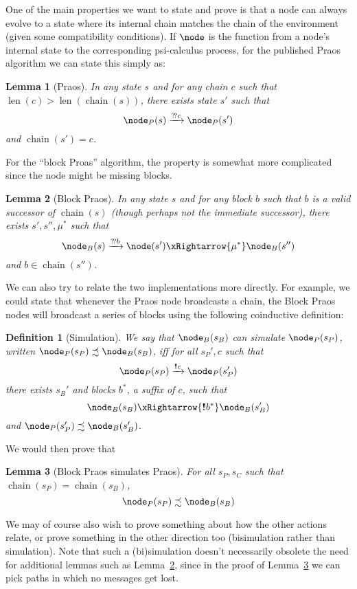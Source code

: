 \documentclass{article}
\newcommand{\bOut}{{!\!!}}
\newcommand{\bIn}{{?\!?}}
\newcommand{\psicalculus}{psi-calculus\xspace}
\newcommand{\refinedBy}{\precsim}
\newtheorem{lemma}{Lemma}
\newtheorem{definition}{Definition}
\DeclareMathOperator{\len}{len}
\DeclareMathOperator{\chain}{chain}
\begin{document}
One of the main properties we want to state and prove is that a node can always
evolve to a state where its internal chain matches the chain of the environment
(given some compatibility conditions). If $\node$ is the function from a node's
internal state to the corresponding \psicalculus process, for the published
Praos algorithm we can state this simply as:
%
\begin{lemma}[Praos]
In any state $s$ and for any chain $c$ such that $\len(c) > \len(\chain(s))$,
there exists state $s'$ such that
\begin{equation*}
\node_P(s) \xrightarrow{\bIn c} \node_P(s')
\end{equation*}
and $\chain(s') = c$.
\end{lemma}
%
For the ``block Proas'' algorithm, the property is somewhat more complicated
since the node might be missing blocks.
%
\begin{lemma}[Block Praos]
\label{lem:blockpraos}
In any state $s$ and for any block $b$ such that $b$ is a valid successor of
$\chain(s)$ (though perhaps not the \emph{immediate} successor), there exists
$s', s'', \mu^*$ such that
\begin{equation*}
\node_B(s) \xrightarrow{\bIn b} \node(s') \xRightarrow{\mu^*} \node_B(s'')
\end{equation*}
and $b \in \chain(s'')$.
\end{lemma}
%
We can also try to relate the two implementations more directly. For example,
we could state that whenever the Praos node broadcasts a chain, the Block Praos
nodes will broadcast a series of blocks using the following coinductive
definition:
%
\begin{definition}[Simulation]
We say that $\node_B(s_B)$ can simulate $\node_P(s_P)$, written
$\node_P(s_P) \refinedBy \node_B(s_B)$, iff for all $s_P', c$ such that
\begin{equation*}
\node_P(s_P) \xrightarrow{\bOut c} \node_P(s_P')
\end{equation*}
there exists $s_B'$ and blocks $b^*$, a suffix of $c$, such that
\begin{equation*}
\node_B(s_B) \xRightarrow{\bOut b^*} \node_B(s_B')
\end{equation*}
and $\node_P(s_P') \refinedBy \node_B(s_B')$.
\end{definition}
%
We would then prove that
%
\begin{lemma}[Block Praos simulates Praos]
\label{lem:BlockSimPraos}
For all $s_P, s_C$ such that $\chain(s_P) = \chain(s_B)$,
\begin{equation*}
\node_P(s_P) \refinedBy \node_B(s_B)
\end{equation*}
\end{lemma}
%
We may of course also wish to prove something about how the other actions
relate, or prove something in the other direction too (bisimulation rather than
simulation). Note that such a (bi)simulation doesn't necessarily obsolete the
need for additional lemmas such as Lemma~\ref{lem:blockpraos}, since in the
proof of Lemma~\ref{lem:BlockSimPraos} we can pick paths in which no messages
get lost.
\end{document}
